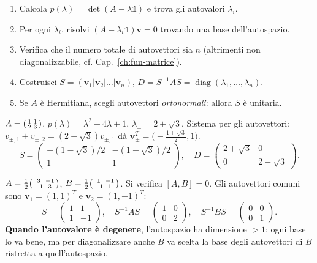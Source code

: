 \documentclass[11pt,a4paper,openany]{book}
\theoremstyle{definition}
\begin{document}
\begin{algoritmo}
\begin{enumerate}
\item Calcola $p(\lambda)=\det(A-\lambda\mathbb 1)$ e trova gli autovalori $\lambda_i$.
\item Per ogni $\lambda_i$, risolvi $(A-\lambda_i\mathbb 1)\bm v=0$ trovando una base dell'autospazio.
\item Verifica che il numero totale di autovettori sia $n$ (altrimenti non diagonalizzabile, cf. Cap.~\ref{ch:fun-matrice}).
\item Costruisci $S=(\bm v_1|\bm v_2|\dots|\bm v_n)$, $D=S^{-1}AS=\operatorname{diag}(\lambda_1,\dots,\lambda_n)$.
\item Se $A$ \`e Hermitiana, scegli autovettori \emph{ortonormali}: allora $S$ \`e unitaria.
\end{enumerate}
\end{algoritmo}

\begin{esempio}[Set 1, Es. 7]
$A=\begin{psmallmatrix}1&1\\2&3\end{psmallmatrix}$. $p(\lambda)=\lambda^2-4\lambda+1$, $\lambda_\pm=2\pm\sqrt 3$. Sistema per gli autovettori: $v_{\pm,1}+v_{\pm,2}=(2\pm\sqrt 3)v_{\pm,1}$ d\`a $\bm v_\pm^T=\bigl(-\tfrac{1\mp\sqrt 3}{2},1\bigr)$.
$$S=\begin{pmatrix}-(1-\sqrt 3)/2 & -(1+\sqrt 3)/2\\ 1 & 1\end{pmatrix},\quad D=\begin{pmatrix}2+\sqrt 3 & 0\\ 0 & 2-\sqrt 3\end{pmatrix}.$$
\end{esempio}

\begin{esempio}
$A=\tfrac{1}{2}\begin{psmallmatrix}3&-1\\-1&3\end{psmallmatrix}$, $B=\tfrac{1}{2}\begin{psmallmatrix}1&-1\\-1&1\end{psmallmatrix}$. Si verifica $[A,B]=0$. Gli autovettori comuni sono $\bm v_1=(1,1)^T$ e $\bm v_2=(1,-1)^T$:
$$S=\begin{pmatrix}1&1\\1&-1\end{pmatrix},\quad S^{-1}AS=\begin{pmatrix}1&0\\0&2\end{pmatrix},\quad S^{-1}BS=\begin{pmatrix}0&0\\0&1\end{pmatrix}.$$
\textbf{Quando l'autovalore \`e degenere}, l'autospazio ha dimensione $>1$: ogni base lo va bene, ma per diagonalizzare anche $B$ va scelta la base degli autovettori di $B$ ristretta a quell'autospazio.
\end{esempio}
\end{document}
